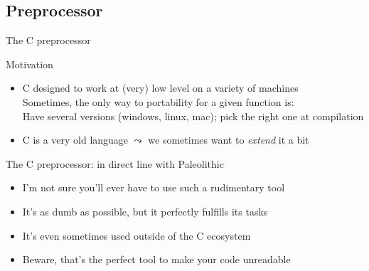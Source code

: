 \subsection{Preprocessor}
\begin{frame}{The C preprocessor}
  \begin{block}{Motivation}
    \begin{itemize}
    \item C designed to work at (very) low level on a variety of machines\\
      Sometimes, the only way to portability for a given function is:\\
      Have several versions {\small(windows, linux, mac)}; pick the right one at compilation
    \item C is a very old language $\leadsto$ we sometimes want to
      \textit{extend} it a bit
    \end{itemize}
  \end{block}

  \begin{block}{The C preprocessor: in direct line with Paleolithic}
    \begin{itemize}
    \item I'm not sure you'll ever have to use such a rudimentary tool 
    \item It's as dumb as possible, but it perfectly fulfills its tasks
    \item It's even sometimes used outside of the C ecosystem
    \item Beware, that's the perfect tool to make your code unreadable
    \end{itemize}    
  \end{block}
\end{frame}
